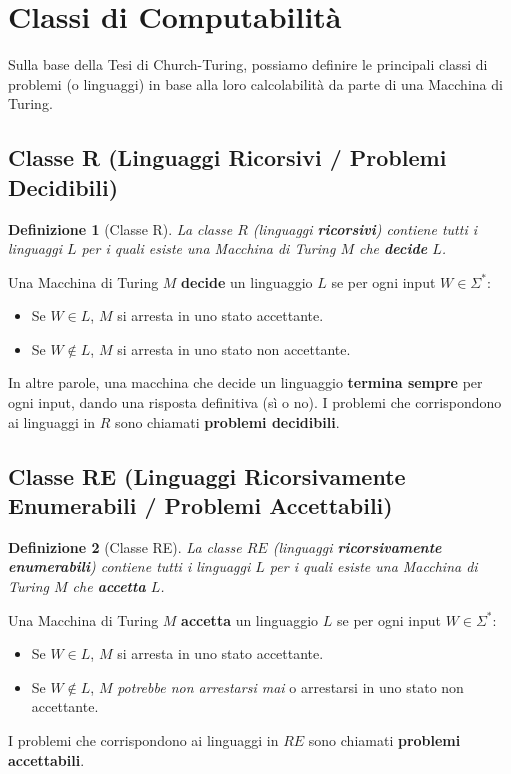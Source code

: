 \documentclass[a4paper]{article}
\newtheorem{definition}{Definizione}
\begin{document}
\section{Classi di Computabilità}

Sulla base della Tesi di Church-Turing, possiamo definire le principali classi di problemi (o linguaggi) in base alla loro calcolabilità da parte di una Macchina di Turing.


\subsection{Classe R (Linguaggi Ricorsivi / Problemi Decidibili)}
\begin{definition}[Classe R]
La classe $R$ (linguaggi \textbf{ricorsivi}) contiene tutti i linguaggi $L$ per i quali esiste una Macchina di Turing $M$ che \textbf{decide} $L$.
\end{definition}
Una Macchina di Turing $M$ \textbf{decide} un linguaggio $L$ se per ogni input $W \in \Sigma^*$:
\begin{itemize}
    \item Se $W \in L$, $M$ si arresta in uno stato accettante.
    \item Se $W \notin L$, $M$ si arresta in uno stato non accettante.
\end{itemize}
In altre parole, una macchina che decide un linguaggio \textbf{termina sempre} per ogni input, dando una risposta definitiva (sì o no). I problemi che corrispondono ai linguaggi in $R$ sono chiamati \textbf{problemi decidibili}.

\subsection{Classe RE (Linguaggi Ricorsivamente Enumerabili / Problemi Accettabili)}
\begin{definition}[Classe RE]
La classe $RE$ (linguaggi \textbf{ricorsivamente enumerabili}) contiene tutti i linguaggi $L$ per i quali esiste una Macchina di Turing $M$ che \textbf{accetta} $L$.
\end{definition}
Una Macchina di Turing $M$ \textbf{accetta} un linguaggio $L$ se per ogni input $W \in \Sigma^*$:
\begin{itemize}
    \item Se $W \in L$, $M$ si arresta in uno stato accettante.
    \item Se $W \notin L$, $M$ \emph{potrebbe non arrestarsi mai} o arrestarsi in uno stato non accettante.
\end{itemize}
I problemi che corrispondono ai linguaggi in $RE$ sono chiamati \textbf{problemi accettabili}.
\end{document}
